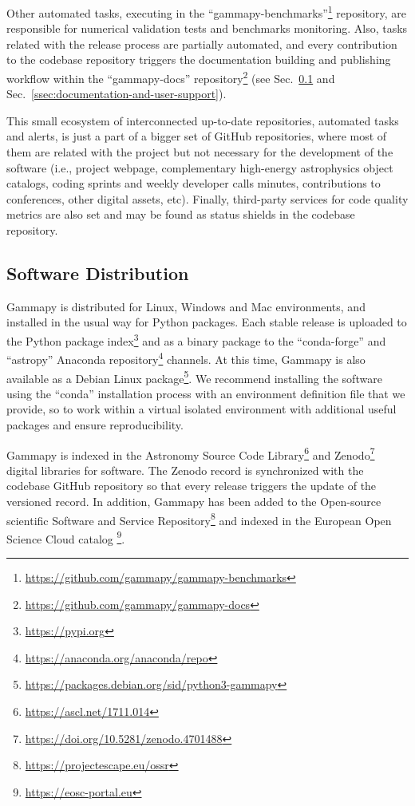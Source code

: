 \documentclass[longauth]{aa}
\newcommand{\gammapy}{Gammapy\xspace}
\newcommand{\github}{GitHub\xspace}
\begin{document}
Other automated tasks, executing in the
\enquote{gammapy-benchmarks}\footnote{\url{https://github.com/gammapy/gammapy-benchmarks}} repository,
are responsible for numerical validation tests and benchmarks monitoring. Also,
tasks related with the release process are partially automated, and every
contribution to the codebase repository triggers the documentation building and
publishing workflow within the
\enquote{gammapy-docs} repository\footnote{\url{https://github.com/gammapy/gammapy-docs}}
(see Sec.~\ref{ssec:software-distribution} and Sec.~\ref{ssec:documentation-and-user-support}).

This small ecosystem of interconnected up-to-date repositories, automated tasks
and alerts, is just a part of a bigger set of \github repositories, where most
of them are related with the project but not necessary for the development of
the software (i.e., project webpage, complementary high-energy astrophysics
object catalogs, coding sprints and weekly developer calls minutes,
contributions to conferences, other digital assets, etc). Finally, third-party
services for code quality metrics are also set and may be found as status
shields in the codebase repository.

\subsection{Software Distribution}
\label{ssec:software-distribution}
\gammapy is distributed for Linux, Windows and Mac environments, and installed
in the usual way for Python packages. Each stable release is uploaded to the
Python package index\footnote{\url{https://pypi.org}} and as a binary package
to the \enquote{conda-forge} and \enquote{astropy} Anaconda
repository\footnote{\url{https://anaconda.org/anaconda/repo}} channels. At this
time, \gammapy is also available as a Debian Linux
package\footnote{\url{https://packages.debian.org/sid/python3-gammapy}}. We
recommend installing the software using the \enquote{conda} installation process
with an environment definition file that we provide, so to work within a
virtual isolated environment with additional useful packages and ensure
reproducibility.

\gammapy is indexed in the Astronomy Source Code
Library\footnote{\url{https://ascl.net/1711.014}} and
Zenodo\footnote{\url{https://doi.org/10.5281/zenodo.4701488}} digital libraries for
software. The Zenodo record is synchronized with the codebase \github repository
so that every release triggers the update of the versioned record. In addition,
 \gammapy has been added to the Open-source scientific
Software and Service Repository\footnote{\url{https://projectescape.eu/ossr}} \citep{10.12688/openreseurope.15692.1}
and indexed in the European Open Science Cloud
catalog \footnote{\url{https://eosc-portal.eu}}.
\end{document}

